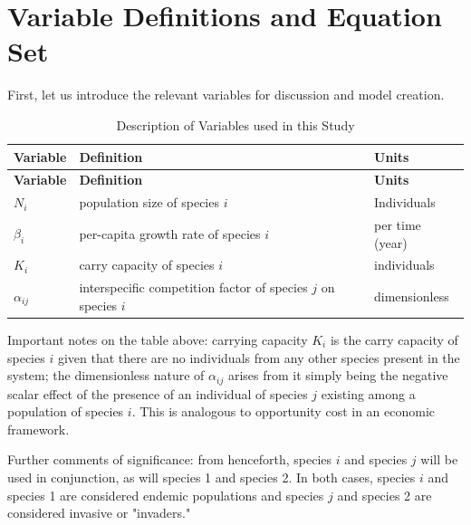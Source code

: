 \documentclass[twocolumn,prb,amsmath,amssymb,amsfonts,nobalancelastpage]{revtex4}
\begin{document}
\section{Variable Definitions and Equation Set}
First, let us introduce the relevant variables for discussion and model creation.
\begin{xltabular}{\linewidth}{ l | X | X}
  \caption{Description of Variables used in this Study} 
 \label{table: vardescription}\\
 \hline \hline

\textbf{\normalsize Variable} & \textbf{\normalsize Definition} & \textbf{\normalsize Units} \\
 \hline 
\endfirsthead
 \hline \hline

\textbf{\normalsize Variable} & \textbf{\normalsize Definition} & \textbf{\normalsize Units} \\
 \hline 
\endhead

\textbf{$N_i$} & population size of species $i$ & Individuals\\ \hline 

\textbf{$\beta_i$} & per-capita growth rate of species $i$ & per time (year) \\ \hline 

\textbf{$K_i$} & carry capacity of species $i$ & individuals \\ \hline

\textbf{$\alpha_{ij}$} & interspecific competition factor of species $j$ on species $i$ & dimensionless \\ \hline

\end{xltabular}

Important notes on the table above: carrying capacity $K_i$ is the carry capacity of species $i$ given that there are no individuals from any other species present in the system; the dimensionless nature of $\alpha_{ij}$ arises from it simply being the negative scalar effect of the presence of an individual of species $j$ existing among a population of species $i$. This is analogous to opportunity cost in an economic framework.

Further comments of significance: from henceforth, species $i$ and species $j$ will be used in conjunction, as will species 1 and species 2. In both cases, species $i$ and species 1 are considered endemic populations and species $j$ and species 2 are considered invasive or "invaders."
\end{document}
